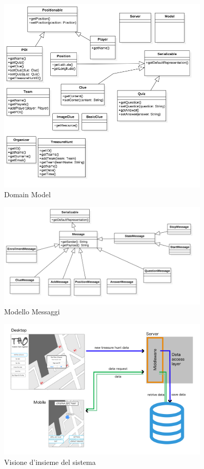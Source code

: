 \documentclass[12pt, italian]{article}
\begin{document}
\begin{figure}[H]
	\centering
	\includegraphics[width=0.9\textwidth]{img/domain_model.png}
	\caption{Domain Model}
\end{figure}

\begin{figure}
	\centering
	\includegraphics[width=0.9\textwidth]{img/messages_model.png}
	\caption{Modello Messaggi}
\end{figure}

\begin{figure}[H]
	\centering
	\includegraphics[width=0.9\textwidth]{img/architetturale01.png}
	\caption{Visione d'insieme del sistema}
\end{figure}
\end{document}
